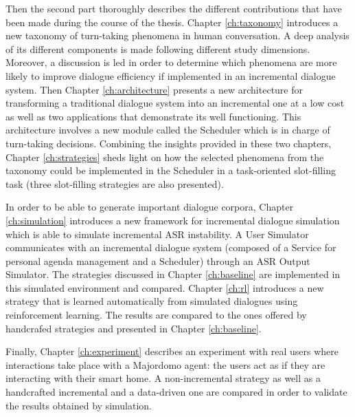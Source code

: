 				Then the second part thoroughly describes the different contributions that have been made during the course of the thesis. Chapter \ref{ch:taxonomy} introduces a new taxonomy of turn-taking phenomena in human conversation. A deep analysis of its different components is made following different study dimensions. Moreover, a discussion is led in order to determine which phenomena are more likely to improve dialogue efficiency if implemented in an incremental dialogue system. Then Chapter \ref{ch:architecture} presents a new architecture for transforming a traditional dialogue system into an incremental one at a low cost as well as two applications that demonstrate its well functioning. This architecture involves a new module called the Scheduler which is in charge of turn-taking decisions. Combining the insights provided in these two chapters, Chapter \ref{ch:strategies} sheds light on how the selected phenomena from the taxonomy could be implemented in the Scheduler in a task-oriented slot-filling task (three slot-filling strategies are also presented).
				
				In order to be able to generate important dialogue corpora, Chapter \ref{ch:simulation} introduces a new framework for incremental dialogue simulation which is able to simulate incremental ASR instability. A User Simulator communicates with an incremental dialogue system (composed of a Service for personal agenda management and a Scheduler) through an ASR Output Simulator. The strategies discussed in Chapter \ref{ch:baseline} are implemented in this simulated environment and compared. Chapter \ref{ch:rl} introduces a new strategy that is learned automatically from simulated dialogues using reinforcement learning. The results are compared to the ones offered by handcrafed strategies and presented in Chapter \ref{ch:baseline}.
				
				Finally, Chapter \ref{ch:experiment} describes an experiment with real users where interactions take place with a Majordomo agent: the users act as if they are interacting with their smart home. A non-incremental strategy as well as a handcrafted incremental and a data-driven one are compared in order to validate the results obtained by simulation.

